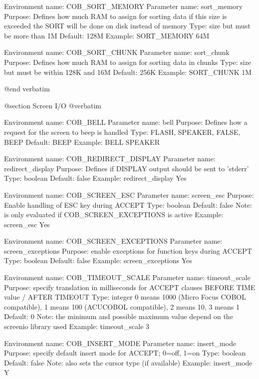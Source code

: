 Environment name:  COB_SORT_MEMORY
  Parameter name:  sort_memory
         Purpose:  Defines how much RAM to assign for sorting data
                   if this size is exceeded the  SORT  will be done
                   on disk instead of memory
            Type:  size  but must be more than 1M
         Default:  128M
         Example:  SORT_MEMORY 64M

Environment name:  COB_SORT_CHUNK
  Parameter name:  sort_chunk
         Purpose:  Defines how much RAM to assign for sorting data in chunks
            Type:  size  but must be within 128K and 16M
         Default:  256K
         Example:  SORT_CHUNK 1M


@end verbatim

@section Screen I/O
@verbatim


Environment name:  COB_BELL
  Parameter name:  bell
         Purpose:  Defines how a request for the screen to beep is handled
            Type:  FLASH, SPEAKER, FALSE, BEEP
         Default:  BEEP
         Example:  BELL SPEAKER

Environment name:  COB_REDIRECT_DISPLAY
  Parameter name:  redirect_display
         Purpose:  Defines if DISPLAY output should be sent to 'stderr'
            Type:  boolean
         Default:  false
         Example:  redirect_display Yes

Environment name:  COB_SCREEN_ESC
  Parameter name:  screen_esc
         Purpose:  Enable handling of ESC key during ACCEPT
            Type:  boolean
         Default:  false
            Note:  is only evaluated if COB_SCREEN_EXCEPTIONS is active
         Example:  screen_esc Yes

Environment name:  COB_SCREEN_EXCEPTIONS
  Parameter name:  screen_exceptions
         Purpose:  enable exceptions for function keys during ACCEPT
            Type:  boolean
         Default:  false
         Example:  screen_exceptions Yes

Environment name:  COB_TIMEOUT_SCALE
  Parameter name:  timeout_scale
         Purpose:  specify translation in milliseconds for ACCEPT clauses
                   BEFORE TIME value / AFTER TIMEOUT
            Type:  integer
                   0 means 1000 (Micro Focus COBOL compatible), 1 means 100
                   (ACUCOBOL compatible), 2 means 10, 3 means 1
         Default:  0
            Note:  the minimum and possible maximum value depend on the
                   screenio library used
         Example:  timeout_scale 3

Environment name:  COB_INSERT_MODE
  Parameter name:  insert_mode
         Purpose:  specify default insert mode for ACCEPT; 0=off, 1=on
            Type:  boolean
         Default:  false
            Note:  also sets the cursor type (if available)
         Example:  insert_mode Y

